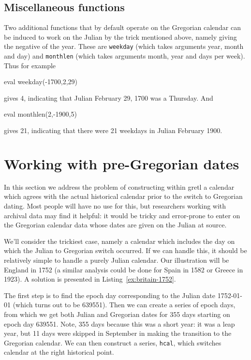 \subsection{Miscellaneous functions}

Two additional functions that by default operate on the Gregorian
calendar can be induced to work on the Julian by the trick mentioned
above, namely giving the negative of the year. These are
\texttt{weekday} (which takes arguments year, month and day) and
\texttt{monthlen} (which takes arguments month, year and days per
week). Thus for example
%
\begin{code}
eval weekday(-1700,2,29)
\end{code}
%
gives 4, indicating that Julian February 29, 1700 was a Thursday. And
%
\begin{code}
eval monthlen(2,-1900,5)
\end{code}
gives 21, indicating that there were 21 weekdays in Julian February
1900.

\section{Working with pre-Gregorian dates}
\label{sec:cal-conversion}

In this section we address the problem of constructing within gretl a
calendar which agrees with the actual historical calendar prior to
the switch to Gregorian dating. Most people will have no use for
this, but researchers working with archival data may find it helpful:
it would be tricky and error-prone to enter on the Gregorian calendar
data whose dates are given on the Julian at source.

We'll consider the trickiest case, namely a calendar which includes
the day on which the Julian to Gregorian switch occurred. If we can
handle this, it should be relatively simple to handle a purely Julian
calendar. Our illustration will be England in 1752 (a similar analysis
could be done for Spain in 1582 or Greece in 1923). A solution
is presented in Listing~\ref{ex:britain-1752}.

The first step is to find the epoch day corresponding to the Julian
date 1752-01-01 (which turns out to be 639551). Then we can create a
series of epoch days, from which we get both Julian and Gregorian
dates for 355 days starting on epoch day 639551. Note, 355 days
because this was a short year: it was a leap year, but 11 days were
skipped in September in making the transition to the Gregorian
calendar. We can then construct a series, \texttt{hcal}, which
switches calendar at the right historical point.

